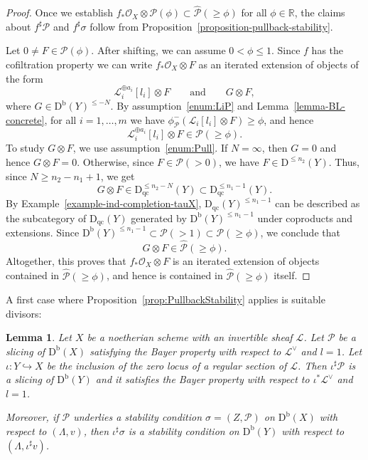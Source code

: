 \documentclass[11pt, reqno]{amsart}
\numberwithin{equation}{section}
\theoremstyle{plain}
\newtheorem{lemma}[theorem]{Lemma}
\theoremstyle{remark}
\theoremstyle{definition}
\theoremstyle{italicsname}
\newcommand{\Db}{\mathrm{D^b}}
\newcommand{\Dqc}{\mathrm{D}_{\mathrm{qc}}}
\newcommand{\cO}{\mathcal{O}}
\newcommand{\cL}{\mathcal{L}}
\newcommand{\cP}{\mathscr{P}}
\def\RR{\ensuremath{\mathbb{R}}}
\begin{document}
\begin{proof}
Once we establish $f_*\cO_X \otimes \cP(\phi) \subset \widehat{\cP}(\geq \phi)$ for all $\phi \in \RR$, the claims about $f^{\sharp}\cP$ and $f^{\sharp}\sigma$ follow from Proposition~\ref{proposition-pullback-stability}. 

Let $0\neq F\in\cP(\phi)$. After shifting, we can assume $0<\phi\leq 1$. Since $f$ has the cofiltration property we can write $f_*\cO_X\otimes F$ as an iterated extension of objects of the form
\[
\cL_i^{\oplus a_i} [l_i]\otimes F\qquad\text{and}\qquad G\otimes F,
\]
where $G \in \Db(Y)^{\leqslant -N}$.
By assumption~\ref{enum:LiP} and Lemma~\ref{lemma-BL-concrete}, for all $i = 1, \dots, m$ we have $\phi^-_\cP(\cL_i[l_i]\otimes F)\geq\phi$, and hence 
\begin{equation*}
   \cL_i^{\oplus a_i}[l_i]\otimes F \in \cP(\geq \phi).  
\end{equation*}
To study $G\otimes F$, we use assumption~\ref{enum:Pull}. 
If $N = \infty$, then $G = 0$ and hence $G \otimes F = 0$. 
Otherwise, since $F\in\cP(>0)$, we have $F\in\mathrm{D}^{\leqslant n_2}(Y)$. 
Thus, since $N\geq n_2-n_1+1$, we get
\[
G\otimes F\in\mathrm{D}^{\leqslant n_2-N}_\mathrm{qc}(Y)
\subset\mathrm{D}^{\leqslant n_1-1}_\mathrm{qc}(Y).
\]
By Example~\ref{example-ind-completion-tauX}, $\Dqc(Y)^{\leq n_1-1}$ can be described as the subcategory of $\Dqc(Y)$ generated by $\Db(Y)^{\leq n_1 - 1}$ under coproducts and extensions. 
Since $\Db(Y)^{\leq n_1-1} \subset \cP(> 1) \subset \cP( \geq \phi)$, we conclude that 
\begin{equation*}
    G \otimes F \in \widehat{\cP}(\geq \phi). 
\end{equation*}
Altogether, this proves that $f_*\cO_X \otimes F$ is an iterated extension of objects contained in $\widehat{\cP}(\geq \phi)$, and hence is contained in $\widehat{\cP}(\geq \phi)$ itself. 
\end{proof}

A first case where Proposition~\ref{prop:PullbackStability} applies is suitable divisors: 

\begin{lemma}
\label{lem:RestCartierDiv}
Let $X$ be a noetherian scheme with an invertible sheaf $\cL$. 
Let $\cP$ be a slicing of $\Db(X)$ satisfying the Bayer property with respect to $\cL^{\vee}$ and $l = 1$. 
Let $\iota \colon Y \hookrightarrow X$ be the inclusion of the zero locus of a regular section of $\cL$.
Then $\iota^\sharp\cP$ is a slicing of $\Db(Y)$ and it satisfies the Bayer property with respect to $\iota^*\cL^\vee$ and $l=1$. 

Moreover, if $\cP$ underlies a stability condition $\sigma = (Z, \cP)$ on $\Db(X)$ with respect to $(\Lambda, v)$, then $\iota^{\sharp}\sigma$ is a stability condition on $\Db(Y)$ with respect to $(\Lambda, \iota^\sharp v)$. 
\end{lemma}
\end{document}
